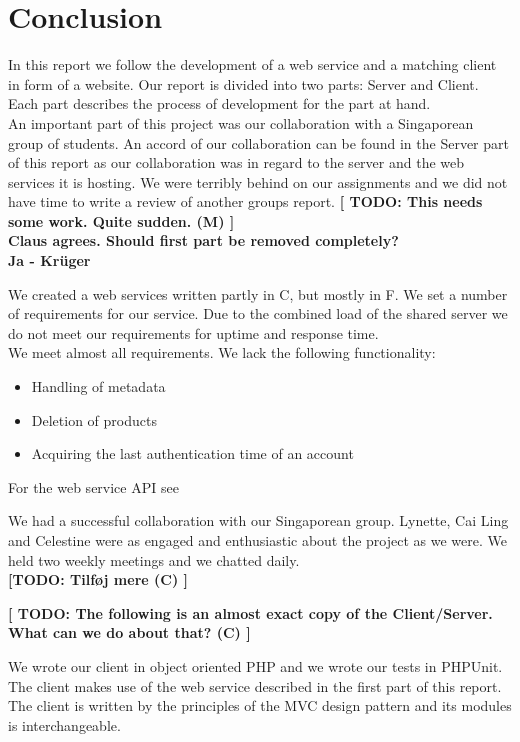 \section{Conclusion}
In this report we follow the development of a web service and a matching client in form of a website. Our report is divided into two parts: Server and Client. Each part describes the process of development for the part at hand.
\\An important part of this project was our collaboration with a Singaporean group of students. An accord of our collaboration can be found in the Server part of this report as our collaboration was in regard to the server and the web services it is hosting.
We were terribly behind on our assignments and we did not have time to write a review of another groups report. \textbf{[ TODO: This needs some work. Quite sudden. (M) ]}
\\\textbf{Claus agrees. Should first part be removed completely?\\Ja - Krüger}

We created a web services written partly in C\Sh, but mostly in F\Sh. We set a number of requirements for our service. Due to the combined load of the shared server we do not meet our requirements for uptime and response time.
\\We meet almost all requirements. We lack the following functionality:
\begin{itemize}
\item Handling of metadata
\item Deletion of products
\item Acquiring the last authentication time of an account
\end{itemize}
\mbox{}For the web service API see 

We had a successful collaboration with our Singaporean group. Lynette, Cai Ling and Celestine were as engaged and enthusiastic about the project as we were. We held two weekly meetings and we chatted daily.
\\\textbf{ [TODO: Tilføj mere (C) ]}

\textbf{[ TODO: The following is an almost exact copy of the Client/Server. What can we do about that? (C) ]}

We wrote our client in object oriented PHP and we wrote our tests in PHPUnit. The client makes use of the web service described in the first part of this report. The client is written by the principles of the MVC design pattern and its modules is interchangeable.

